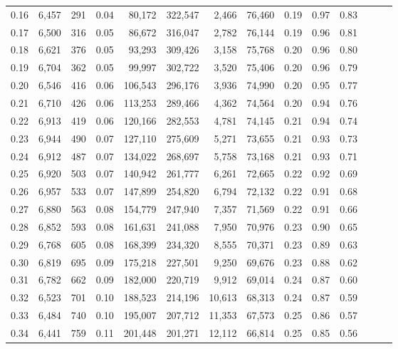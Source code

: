 \begin{tabular}{rrrrrrrrrrrrrr}
0.16 &  6,457 &    291 &  0.04 &   80,172 &  322,547 &   2,466 &  76,460 &  0.19 &  0.97 &      0.83 \\
0.17 &  6,500 &    316 &  0.05 &   86,672 &  316,047 &   2,782 &  76,144 &  0.19 &  0.96 &      0.81 \\
0.18 &  6,621 &    376 &  0.05 &   93,293 &  309,426 &   3,158 &  75,768 &  0.20 &  0.96 &      0.80 \\
0.19 &  6,704 &    362 &  0.05 &   99,997 &  302,722 &   3,520 &  75,406 &  0.20 &  0.96 &      0.79 \\
0.20 &  6,546 &    416 &  0.06 &  106,543 &  296,176 &   3,936 &  74,990 &  0.20 &  0.95 &      0.77 \\
0.21 &  6,710 &    426 &  0.06 &  113,253 &  289,466 &   4,362 &  74,564 &  0.20 &  0.94 &      0.76 \\
0.22 &  6,913 &    419 &  0.06 &  120,166 &  282,553 &   4,781 &  74,145 &  0.21 &  0.94 &      0.74 \\
0.23 &  6,944 &    490 &  0.07 &  127,110 &  275,609 &   5,271 &  73,655 &  0.21 &  0.93 &      0.73 \\
0.24 &  6,912 &    487 &  0.07 &  134,022 &  268,697 &   5,758 &  73,168 &  0.21 &  0.93 &      0.71 \\
0.25 &  6,920 &    503 &  0.07 &  140,942 &  261,777 &   6,261 &  72,665 &  0.22 &  0.92 &      0.69 \\
0.26 &  6,957 &    533 &  0.07 &  147,899 &  254,820 &   6,794 &  72,132 &  0.22 &  0.91 &      0.68 \\
0.27 &  6,880 &    563 &  0.08 &  154,779 &  247,940 &   7,357 &  71,569 &  0.22 &  0.91 &      0.66 \\
0.28 &  6,852 &    593 &  0.08 &  161,631 &  241,088 &   7,950 &  70,976 &  0.23 &  0.90 &      0.65 \\
0.29 &  6,768 &    605 &  0.08 &  168,399 &  234,320 &   8,555 &  70,371 &  0.23 &  0.89 &      0.63 \\
0.30 &  6,819 &    695 &  0.09 &  175,218 &  227,501 &   9,250 &  69,676 &  0.23 &  0.88 &      0.62 \\
0.31 &  6,782 &    662 &  0.09 &  182,000 &  220,719 &   9,912 &  69,014 &  0.24 &  0.87 &      0.60 \\
0.32 &  6,523 &    701 &  0.10 &  188,523 &  214,196 &  10,613 &  68,313 &  0.24 &  0.87 &      0.59 \\
0.33 &  6,484 &    740 &  0.10 &  195,007 &  207,712 &  11,353 &  67,573 &  0.25 &  0.86 &      0.57 \\
0.34 &  6,441 &    759 &  0.11 &  201,448 &  201,271 &  12,112 &  66,814 &  0.25 &  0.85 &      0.56 \\

\end{tabular}
